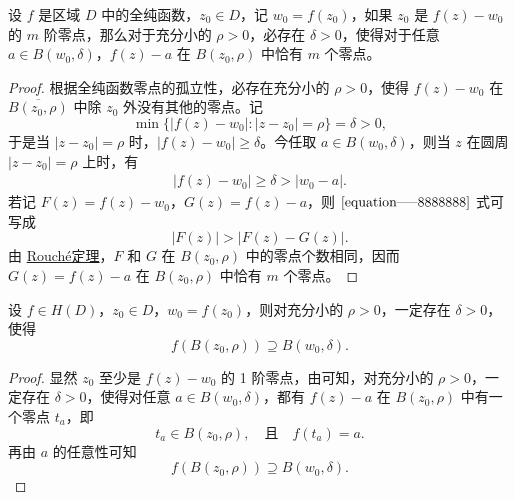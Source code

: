 \documentclass[../../main.tex]{subfiles}%
\begin{document}
\begin{theorem}\label{theorem:定理4.4.4}
设 \( f \) 是区域 \( D \) 中的全纯函数，\( z_0 \in D \)，记 \( w_0 = f(z_0) \)，如果 \( z_0 \) 是 \( f(z) - w_0 \) 的 \( m \) 阶零点，那么对于充分小的 \( \rho > 0 \)，必存在 \( \delta > 0 \)，使得对于任意 \( a \in B(w_0, \delta) \)，\( f(z) - a \) 在 \( B(z_0, \rho) \) 中恰有 \( m \) 个零点。
\end{theorem}
\begin{proof}

根据全纯函数零点的孤立性，必存在充分小的 \( \rho > 0 \)，使得 \( f(z) - w_0 \) 在 \( \overline{B(z_0, \rho)} \) 中除 \( z_0 \) 外没有其他的零点。记
\[
\min \{ |f(z) - w_0| : |z - z_0| = \rho \} = \delta > 0,
\]
于是当 \( |z - z_0| = \rho \) 时，\( |f(z) - w_0| \geqslant  \delta \)。今任取 \( a \in B(w_0, \delta) \)，则当 \( z \) 在圆周 \( |z - z_0| = \rho \) 上时，有
\begin{align}
|f(z) - w_0| \geqslant  \delta > |w_0 - a|. \label{equation-----8888888}
\end{align}
若记 \( F(z) = f(z) - w_0 \)，\( G(z) = f(z) - a \)，则 \(\eqref{equation-----8888888}\) 式可写成
\[
|F(z)| > |F(z) - G(z)|.
\]
由 \hyperref[theorem:Rouché定理-定理4.4.3]{Rouché定理}，\( F \) 和 \( G \) 在 \( B(z_0, \rho) \) 中的零点个数相同，因而 \( G(z) = f(z) - a \) 在 \( B(z_0, \rho) \) 中恰有 \( m \) 个零点。 

\end{proof}

\begin{corollary}\label{corollary:推论4.4.5}
设 \( f \in H(D) \)，\( z_0 \in D \)，\( w_0 = f(z_0) \)，则对充分小的 \( \rho > 0 \)，一定存在 \( \delta > 0 \)，使得
\[
f(B(z_0, \rho)) \supseteq B(w_0, \delta).
\]
\end{corollary}
\begin{proof}

显然 \( z_0 \) 至少是 \( f(z) - w_0 \) 的 1 阶零点，由可知，对充分小的 \( \rho > 0 \)，一定存在 \( \delta > 0 \)，使得对任意 \( a \in B(w_0, \delta) \)，都有 \( f(z) - a \) 在 \( B(z_0, \rho) \) 中有一个零点 \( t_a \)，即
\[
t_a \in B(z_0, \rho), \quad \text{且} \quad f(t_a) = a.
\]
再由 \( a \) 的任意性可知
\[
f(B(z_0, \rho)) \supseteq B(w_0, \delta).
\]

\end{proof}
\end{document}
